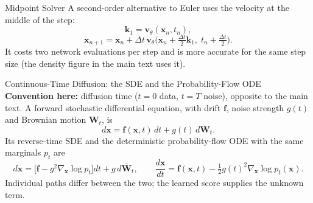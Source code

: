\documentclass{ntuabeamer}
\begin{document}
\begin{frame}{Midpoint Solver}
  A second-order alternative to Euler uses the velocity at the middle of the step:
  \[
    \mathbf k_1=\mathbf v_\theta(\mathbf x_n,t_n),
  \]
  \[
    \mathbf x_{n+1}=\mathbf x_n+\Delta t\,\mathbf v_\theta\!\big(\mathbf x_n+\tfrac{\Delta t}{2}\mathbf k_1,\;t_n+\tfrac{\Delta t}{2}\big).
  \]
  It costs two network evaluations per step and is more accurate for the same step size
  (the density figure in the main text uses it).
\end{frame}

\begin{frame}{Continuous-Time Diffusion: the SDE and the Probability-Flow ODE}
  \small
  \textbf{Convention here:} diffusion time (\(t=0\) data, \(t=T\) noise), opposite to the main text.
  A forward stochastic differential equation, with drift \(\mathbf f\), noise strength \(g(t)\) and Brownian motion \(\mathbf W_t\), is
  \[
    d\mathbf x=\mathbf f(\mathbf x,t)\,dt+g(t)\,d\mathbf W_t .
  \]
  Its reverse-time SDE and the deterministic probability-flow ODE with the same marginals \(p_t\) are
  \[
    d\mathbf x=\big[\mathbf f-g^2\nabla_{\mathbf x}\log p_t\big]dt+g\,d\overline{\mathbf W}_t,
    \qquad
    \frac{d\mathbf x}{dt}=\mathbf f(\mathbf x,t)-\tfrac12g(t)^2\nabla_{\mathbf x}\log p_t(\mathbf x).
  \]
  Individual paths differ between the two; the learned score supplies the unknown term.
\end{frame}
\end{document}
